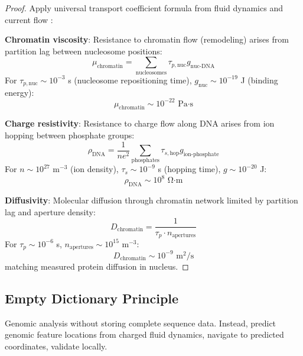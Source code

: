 \begin{proof}
Apply universal transport coefficient formula from fluid dynamics \citep{Sachikonye2025_Fluid} and current flow \citep{Sachikonye2025_Current}:

\textbf{Chromatin viscosity}: Resistance to chromatin flow (remodeling) arises from partition lag between nucleosome positions:
\begin{equation}
\mu_{\text{chromatin}} = \sum_{\text{nucleosomes}} \tau_{p,\text{nuc}} g_{\text{nuc-DNA}}
\end{equation}
For $\tau_{p,\text{nuc}} \sim 10^{-3}$ s (nucleosome repositioning time), $g_{\text{nuc}} \sim 10^{-19}$ J (binding energy):
\begin{equation}
\mu_{\text{chromatin}} \sim 10^{-22} \text{ Pa·s}
\end{equation}

\textbf{Charge resistivity}: Resistance to charge flow along DNA arises from ion hopping between phosphate groups:
\begin{equation}
\rho_{\text{DNA}} = \frac{1}{ne^2}\sum_{\text{phosphates}} \tau_{s,\text{hop}} g_{\text{ion-phosphate}}
\end{equation}
For $n \sim 10^{27}$ m$^{-3}$ (ion density), $\tau_s \sim 10^{-9}$ s (hopping time), $g \sim 10^{-20}$ J:
\begin{equation}
\rho_{\text{DNA}} \sim 10^8 \text{ Ω·m}
\end{equation}

\textbf{Diffusivity}: Molecular diffusion through chromatin network limited by partition lag and aperture density:
\begin{equation}
D_{\text{chromatin}} = \frac{1}{\tau_p \cdot n_{\text{apertures}}}
\end{equation}
For $\tau_p \sim 10^{-6}$ s, $n_{\text{apertures}} \sim 10^{15}$ m$^{-3}$:
\begin{equation}
D_{\text{chromatin}} \sim 10^{-9} \text{ m}^2\text{/s}
\end{equation}
matching measured protein diffusion in nucleus.
\end{proof}

\subsection{Empty Dictionary Principle}

\begin{definition}
\label{def:empty_dictionary}
Genomic analysis without storing complete sequence data. Instead, predict genomic feature locations from charged fluid dynamics, navigate to predicted coordinates, validate locally.
\end{definition}

